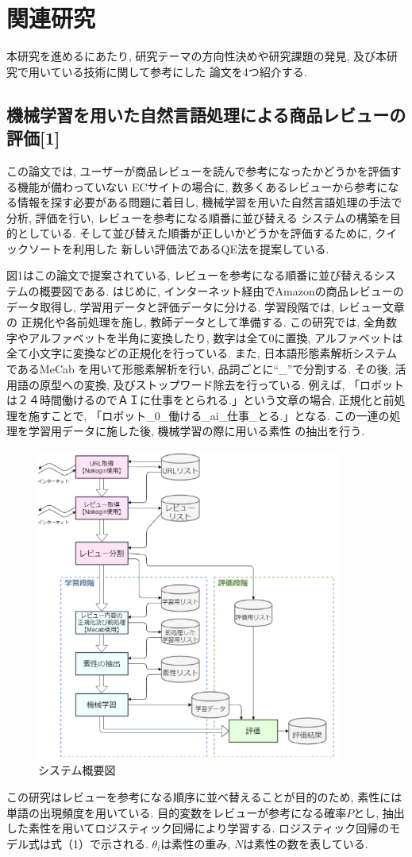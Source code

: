 \documentclass{ltjarticle}
\begin{document}
\newpage
\section{関連研究}
本研究を進めるにあたり, 研究テーマの方向性決めや研究課題の発見, 及び本研究で用いている技術に関して参考にした
論文を4つ紹介する. 
\subsection{機械学習を用いた自然言語処理による商品レビューの評価[1]}
この論文では, ユーザーが商品レビューを読んで参考になったかどうかを評価する機能が備わっていない
ECサイトの場合に, 数多くあるレビューから参考になる情報を探す必要がある問題に着目し, 
機械学習を用いた自然言語処理の手法で分析, 評価を行い, レビューを参考になる順番に並び替える
システムの構築を目的としている. そして並び替えた順番が正しいかどうかを評価するために, クイックソートを利用した
新しい評価法であるQE法を提案している. 

図1はこの論文で提案されている, レビューを参考になる順番に並び替えるシステムの概要図である. はじめに, 
インターネット経由でAmazonの商品レビューのデータ取得し, 学習用データと評価データに分ける. 学習段階では, レビュー文章の
正規化や各前処理を施し, 教師データとして準備する. 
この研究では, 全角数字やアルファベットを半角に変換したり, 
数字は全て0に置換, アルファベットは全て小文字に変換などの正規化を行っている. また, 日本語形態素解析システムであるMeCab
を用いて形態素解析を行い, 品詞ごとに``\_''で分割する. その後, 活用語の原型への変換, 及びストップワード除去を行っている.
例えば, 「ロボットは２４時間働けるのでＡＩに仕事をとられる.」という文章の場合, 正規化と前処理を施すことで, 
「ロボット\_0\_働ける\_ai\_仕事\_とる.」となる. この一連の処理を学習用データに施した後, 機械学習の際に用いる素性
の抽出を行う. 
\begin{figure}[h]
    \centering
    \includegraphics[width=10cm]{images/system1.png}
    \caption{システム概要図}
\end{figure}
この研究はレビューを参考になる順序に並べ替えることが目的のため, 素性には単語の出現頻度を用いている. 
目的変数をレビューが参考になる確率$P$とし, 抽出した素性を用いてロジスティック回帰により学習する. 
ロジスティック回帰のモデル式は式（1）で示される. $\theta_i$は素性の重み, $N$は素性の数を表している. 
\vspace{5truept}
\end{document}
